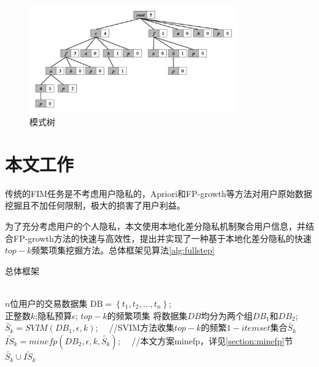 \documentclass[UTF8]{ctexart}
\begin{document}
  \begin{figure}[h]
    \centering
    \includegraphics[width=0.8\textwidth]{fptree.pdf}
    \caption{模式树}
    \label{fig:fptree}
  \end{figure}


\section{本文工作}
\label{section:fullstep}
传统的FIM任务是不考虑用户隐私的，Apriori\cite{agrawal1994fast}和FP-growth\cite{han2000mining}等方法对用户原始数据挖掘且不加任何限制，极大的损害了用户利益。

为了充分考虑用户的个人隐私，本文使用本地化差分隐私机制聚合用户信息，并结合FP-growth方法\cite{han2000mining}的快速与高效性，提出并实现了一种基于本地化差分隐私的快速$top-k$频繁项集挖掘方法。总体框架见算法\ref{alg:fullstep}

\begin{algorithm}[htbp]
    \caption{总体框架}
    \label{alg:fullstep}
        \begin{algorithmic}[1]
        \REQUIRE ~~\\
        $n$位用户的交易数据集 $\mathrm{DB}=\left\{t_{1}, t_{2}, \ldots, t_{n}\right\}$;\\
        正整数$k$;隐私预算$\epsilon$;
        \ENSURE $top-k$的频繁项集
        \STATE 将数据集$DB$均分为两个组$D B_{1}$和$D B_{2}$;
        \label{fullstep:group}
			 \STATE $\tilde{S_k} = SVIM(DB_1,\epsilon,k)$; \ \  //SVIM\cite{wang2018locally}方法收集$top-k$的频繁$1-itemset$集合$\tilde{S_k}$
        \label{fullstep:SVIM}
			 \STATE $\tilde{IS_k} = minefp(DB_2,\epsilon,k,\tilde{S_k})$; \ \  //本文方案minefp，详见\ref{section:minefp}节
			 \label{fullstep:minefp}
        \RETURN $\tilde{S_k} \cup \tilde{IS_k}$
        \end{algorithmic}
\end{algorithm}
\end{document}
